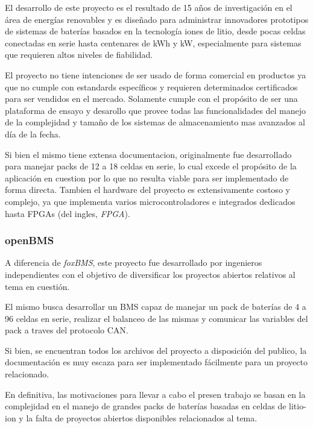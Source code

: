 \documentclass[10pt,a4paper]{article}
\begin{document}
\noindent El desarrollo de este proyecto es el resultado de 15 años de
investigaci\'on en el \'area de energ\'ias renovables y es diseñado para 
administrar innovadores prototipos de sistemas de bater\'ias basados en la 
tecnolog\'ia iones de litio, desde pocas celdas conectadas en serie hasta 
centenares de kWh y kW, especialmente para sistemas que requieren altos niveles 
de fiabilidad.

\noindent El proyecto no tiene intenciones de ser usado de forma comercial en
productos ya que no cumple con estandards espec\'ificos y requieren determinados
certificados para ser vendidos en el mercado. Solamente cumple con el 
prop\'osito de ser una plataforma de ensayo y desarollo que provee todas las 
funcionalidades del manejo de la complejidad y tamaño de los sistemas de 
almacenamiento mas avanzados al d\'ia de la fecha.

\noindent Si bien el mismo tiene extensa documentacion, originalmente fue
desarrollado para manejar packs de 12 a 18 celdas en serie, lo cual excede el
prop\'osito de la aplicaci\'on en cuestion por lo que no resulta viable para ser
implementado de forma directa. Tambien el hardware del proyecto es
extensivamente costoso y complejo, ya que implementa varios microcontroladores e
integrados dedicados hasta \acrshort{FPGA}s (del ingles, \emph{\acrlong{FPGA}}).

\subsubsection{openBMS}

A diferencia de \emph{foxBMS}, este proyecto fue desarrollado por ingenieros
independientes con el objetivo de diversificar los proyectos abiertos relativos
al tema en cuesti\'on.

\noindent El mismo busca desarrollar un \acrshort{BMS} capaz de manejar un
pack de bater\'ias de 4 a 96 celdas en serie, realizar el balanceo de las mismas 
y comunicar las variables del pack a traves del protocolo \acrshort{CAN}.

\noindent Si bien, se encuentran todos los archivos del proyecto a disposición
del publico, la documentaci\'on es muy escaza para ser implementado
f\'acilmente para un proyecto relacionado.

\noindent En definitiva, las motivaciones para llevar a cabo el presen trabajo
se basan en la complejidad en el manejo de grandes packs de
bater\'ias basadas en celdas de litio-ion y la falta de proyectos abiertos
disponibles relacionados al tema.
\end{document}
